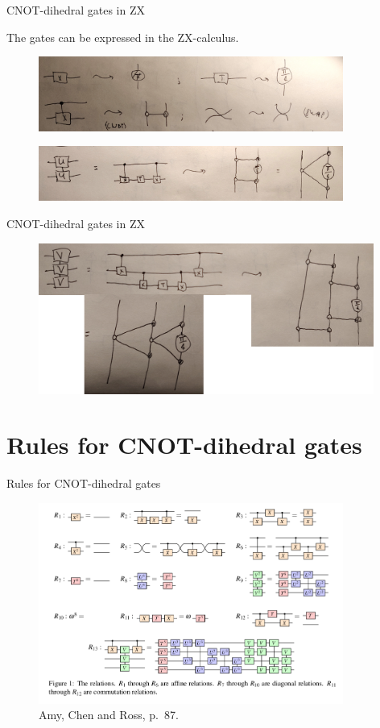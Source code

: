 \documentclass{beamer}
\theoremstyle{definition}
\begin{document}
\begin{frame}{CNOT-dihedral gates in ZX}

The gates can be expressed in the ZX-calculus.
\begin{figure}
\includegraphics[width=10cm]{gates-in-ZX}
\centering
\end{figure}
\begin{figure}
\includegraphics[width=10cm]{U-in-ZX}
\centering
\end{figure}
\end{frame}

\begin{frame}{CNOT-dihedral gates in ZX}
\begin{figure}
\includegraphics[width=11cm]{V-in-ZX}
\centering
\end{figure}
\end{frame}

\section{Rules for CNOT-dihedral gates}

\begin{frame}{Rules for CNOT-dihedral gates}

\begin{figure}
\includegraphics[width=10cm]{relations}
\centering
\caption{Amy, Chen and Ross, p.~87.}
\end{figure}
\end{frame}
\end{document}
